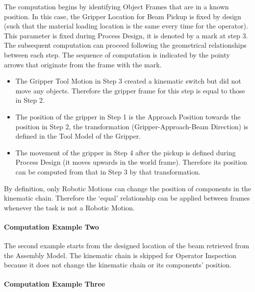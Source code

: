 

The computation begins by identifying Object Frames that are in a known position. In this case, the Gripper Location for Beam Pickup is fixed by design (such that the material loading location is the same every time for the operator). This parameter is fixed during Process Design, it is denoted by a \checkmark mark at step 3. The subsequent computation can proceed following the geometrical relationships between each step. The sequence of computation is indicated by the pointy arrows that originate from the frame with the \checkmark mark. 

\begin{itemize}
	\item The Gripper Tool Motion in Step 3 created a kinematic switch but did not move any objects. Therefore the gripper frame for this step is equal to those in Step 2.

	\item The position of the gripper in Step 1 is the Approach Position towards the position in Step 2, the transformation (Gripper-Approach-Beam Direction) is defined in the Tool Model of the Gripper.

	\item The movement of the gripper in Step 4 after the pickup is defined during Process Design (it moves upwards in the world frame). Therefore its position can be computed from that in Step 3 by that transformation. 

\end{itemize}
By definition, only Robotic Motions can change the position of components in the kinematic chain. Therefore the ‘equal’ relationship can be applied between frames whenever the task is not a Robotic Motion.

\paragraph{Computation Example Two}

The second example starts from the designed location of the beam retrieved from the Assembly Model. The kinematic chain is skipped for Operator Inspection because it does not change the kinematic chain or its components’ position.




\paragraph{Computation Example Three}

